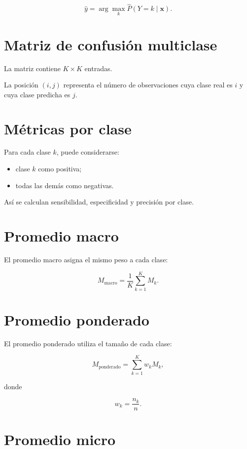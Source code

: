\documentclass[
  spanish,
  11pt,
  letterpaper,
  DIV=11,
  numbers=noendperiod]{scrreprt}
\providecommand{\tightlist}{%
  \setlength{\itemsep}{0pt}\setlength{\parskip}{0pt}}
\theoremstyle{definition}
\theoremstyle{plain}
\theoremstyle{definition}
\theoremstyle{remark}
\begin{document}
\[
\widehat{y}
=
\arg\max_k
\widehat{P}(Y=k\mid\mathbf{x}).
\]

\section{Matriz de confusión
multiclase}\label{matriz-de-confusiuxf3n-multiclase}

La matriz contiene \(K\times K\) entradas.

La posición \((i,j)\) representa el número de observaciones cuya clase
real es \(i\) y cuya clase predicha es \(j\).

\section{Métricas por clase}\label{muxe9tricas-por-clase}

Para cada clase \(k\), puede considerarse:

\begin{itemize}
\tightlist
\item
  clase \(k\) como positiva;
\item
  todas las demás como negativas.
\end{itemize}

Así se calculan sensibilidad, especificidad y precisión por clase.

\section{Promedio macro}\label{promedio-macro}

El promedio macro asigna el mismo peso a cada clase:

\[
M_{\text{macro}}
=
\frac{1}{K}
\sum_{k=1}^{K}
M_k.
\]

\section{Promedio ponderado}\label{promedio-ponderado}

El promedio ponderado utiliza el tamaño de cada clase:

\[
M_{\text{ponderado}}
=
\sum_{k=1}^{K}
w_kM_k,
\]

donde

\[
w_k
=
\frac{n_k}{n}.
\]

\section{Promedio micro}\label{promedio-micro}
\end{document}

